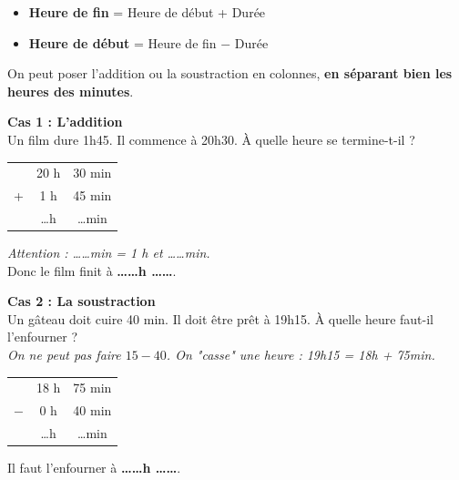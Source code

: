 \documentclass[a4paper]{book}
\begin{document}
    \begin{methode}
        \begin{itemize}
            \item \textbf{Heure de fin} = Heure de début + Durée
            \item \textbf{Heure de début} = Heure de fin $-$ Durée
        \end{itemize}
        On peut poser l'addition ou la soustraction en colonnes, \textbf{en séparant bien les heures des minutes}.
    \end{methode}
    
    \begin{exemple}
        \begin{minipage}{0.48\textwidth}
            \textbf{Cas 1 : L'addition}\\
            Un film dure 1h45. Il commence à 20h30. À quelle heure se termine-t-il ?\\
            
            \begin{tabular}{r c c}
                 & 20 h & 30 min \\
               + &  1 h & 45 min \\
               \hline
                 & \dots h & \dots min
            \end{tabular}
            
            \medskip
            
            \textit{Attention : \dots\dots min = 1 h et \dots\dots min.}\\[1ex]
            Donc le film finit à \textbf{\dots\dots h \dots\dots}.
        \end{minipage}
        \hfill \vline \hfill
        \begin{minipage}{0.48\textwidth}
            \textbf{Cas 2 : La soustraction}\\
            Un gâteau doit cuire 40 min. Il doit être prêt à 19h15. À quelle heure faut-il l'enfourner ?\\
            
            \textit{On ne peut pas faire $15 - 40$. On "casse" une heure : 19h15 = 18h + 75min.}\\
            
            \begin{tabular}{r c c}
                 & 18 h & 75 min \\
               $-$ &  0 h & 40 min \\
               \hline
                 & \dots h & \dots min
            \end{tabular}
            
            \medskip
            
            Il faut l'enfourner à \textbf{\dots\dots h \dots\dots}.
        \end{minipage}
    \end{exemple}
\end{document}
